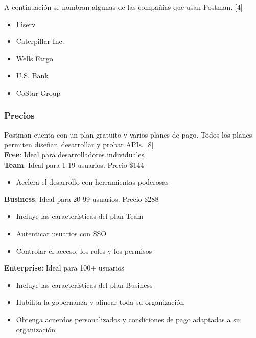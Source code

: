 \documentclass[twoside,twocolumn]{article}
\begin{document}
A continuación se nombran algunas de las compañias que usan Postman. [4]

\begin{itemize}
  \item Fiserv
  \item Caterpillar Inc.
  \item Wells Fargo
  \item U.S. Bank
  \item CoStar Group
\end{itemize}

\subsubsection{Precios}

Postman cuenta con un plan gratuito y varios planes de pago. Todos los planes permiten diseñar, desarrollar y probar APIs. [8] \\

\textbf{Free}: Ideal para desarrolladores individuales \\

\textbf{Team}: Ideal para 1-19 usuarios. Precio \$144 \\

\begin{itemize}
  \item Acelera el desarrollo con herramientas poderosas
\end{itemize}

\textbf{Business}: Ideal para 20-99 usuarios. Precio \$288 \\

\begin{itemize}
  \item Incluye las características del plan Team
  \item Autenticar usuarios con SSO
  \item Controlar el acceso, los roles y los permisos
\end{itemize}

\textbf{Enterprise}: Ideal para 100+ usuarios \\

\begin{itemize}
  \item Incluye las características del plan Business
  \item Habilita la gobernanza y alinear toda su organización
  \item Obtenga acuerdos personalizados y condiciones de pago adaptadas a su organización
\end{itemize}
\end{document}
